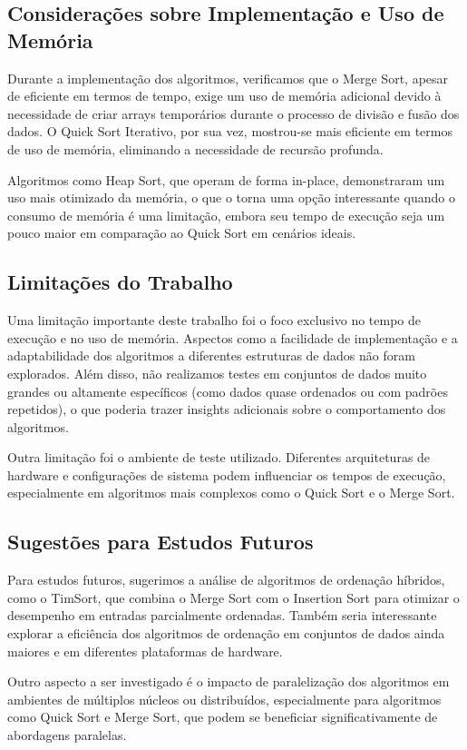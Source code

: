 \documentclass[12pt,a4paper]{article}
\begin{document}
\subsection{Considerações sobre Implementação e Uso de Memória}
Durante a implementação dos algoritmos, verificamos que o Merge Sort, apesar de eficiente em termos de tempo, exige um uso de memória adicional devido à necessidade de criar arrays temporários durante o processo de divisão e fusão dos dados. O Quick Sort Iterativo, por sua vez, mostrou-se mais eficiente em termos de uso de memória, eliminando a necessidade de recursão profunda.

Algoritmos como Heap Sort, que operam de forma in-place, demonstraram um uso mais otimizado da memória, o que o torna uma opção interessante quando o consumo de memória é uma limitação, embora seu tempo de execução seja um pouco maior em comparação ao Quick Sort em cenários ideais.

\subsection{Limitações do Trabalho}
Uma limitação importante deste trabalho foi o foco exclusivo no tempo de execução e no uso de memória. Aspectos como a facilidade de implementação e a adaptabilidade dos algoritmos a diferentes estruturas de dados não foram explorados. Além disso, não realizamos testes em conjuntos de dados muito grandes ou altamente específicos (como dados quase ordenados ou com padrões repetidos), o que poderia trazer insights adicionais sobre o comportamento dos algoritmos.

Outra limitação foi o ambiente de teste utilizado. Diferentes arquiteturas de hardware e configurações de sistema podem influenciar os tempos de execução, especialmente em algoritmos mais complexos como o Quick Sort e o Merge Sort.

\subsection{Sugestões para Estudos Futuros}
Para estudos futuros, sugerimos a análise de algoritmos de ordenação híbridos, como o TimSort, que combina o Merge Sort com o Insertion Sort para otimizar o desempenho em entradas parcialmente ordenadas. Também seria interessante explorar a eficiência dos algoritmos de ordenação em conjuntos de dados ainda maiores e em diferentes plataformas de hardware.

Outro aspecto a ser investigado é o impacto de paralelização dos algoritmos em ambientes de múltiplos núcleos ou distribuídos, especialmente para algoritmos como Quick Sort e Merge Sort, que podem se beneficiar significativamente de abordagens paralelas.
\end{document}

